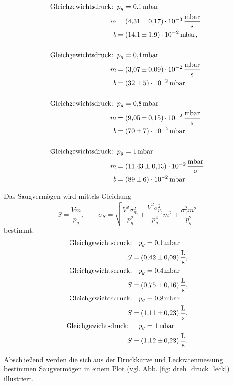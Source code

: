 \begin{align*}
  \text{Gleichgewichtsdruck: } &\, p_g=\SI{0.1}{\milli\bar} \\
  m&= \SI{4.31\pm 0.17 e-3 }{\milli\bar\per\second}\\
  b&=\SI{14.1\pm1.9 e-2}{\milli\bar},\\
  \\
  \text{Gleichgewichtsdruck: } &\, p_g=\SI{0.4}{\milli\bar} \\
  m&= \SI{3.07\pm 0.09 e-2 }{\milli\bar\per\second}\\
  b&=\SI{32\pm5 e-2}{\milli\bar},\\
  \\
  \text{Gleichgewichtsdruck: } &\, p_g=\SI{0.8}{\milli\bar}\\
  m&= \SI{9.05\pm 0.15 e-2 }{\milli\bar\per\second}\\
  b&=\SI{70\pm7 e-2}{\milli\bar},\\
  \\
  \text{Gleichgewichtsdruck: } &\, p_g=\SI{1}{\milli\bar}\\
  m&= \SI{11.43\pm 0.13 e-2 }{\milli\bar\per\second}\\
  b&=\SI{89\pm 6 e-2}{\milli\bar}.
\end{align*}

Das Saugvermögen wird mittels Gleichung
\begin{equation}
  \label{eq:saug_leck}
  S=\frac{Vm}{p_g}, \qquad \sigma_{S}=\sqrt{\frac{V^{2} \sigma_{m}^{2}}{p_{g}^{2}} + \frac{V^{2} \sigma_{p_{g}}^{2}}{p_{g}^{4}} m^{2} + \frac{\sigma_{V}^{2} m^{2}}{p_{g}^{2}}}
\end{equation}
bestimmt.
\begin{align*}
  \text{Gleichgewichtsdruck:} &\quad p_g=\SI{0.1}{\milli\bar} \\
  S&=\SI{0.42\pm 0.09}{\litre\per\second},
  \\
  \text{Gleichgewichtsdruck:} &\quad p_g=\SI{0.4}{\milli\bar} \\
  S&=\SI{0.75\pm 0.16}{\litre\per\second},
  \\
  \text{Gleichgewichtsdruck:} &\quad p_g=\SI{0.8}{\milli\bar}\\
  S&=\SI{1.11\pm 0.23}{\litre\per\second},
  \\
  \text{Gleichgewichtsdruck: } &\quad p_g=\SI{1}{\milli\bar}\\
  S&=\SI{1.12\pm 0.23}{\litre\per\second}.
\end{align*}

Abschließend werden die sich aus der Druckkurve und Leckratenmessung bestimmen
Saugvermögen in einem Plot (vgl. Abb. \ref{fig: dreh_druck_leck}) illustriert.

